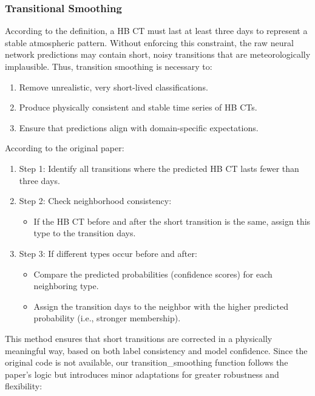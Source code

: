 \documentclass[
]{krantz}
\providecommand{\tightlist}{%
  \setlength{\itemsep}{0pt}\setlength{\parskip}{0pt}}
\begin{document}
\subsubsection{Transitional Smoothing}\label{transitional-smoothing}

According to the definition, a HB CT must last at least three days \citep{Hess1952} to represent a stable atmospheric pattern.
Without enforcing this constraint, the raw neural network predictions may contain short, noisy transitions that are meteorologically implausible.
Thus, transition smoothing is necessary to:

\begin{enumerate}
\def\labelenumi{\arabic{enumi}.}
\tightlist
\item
  Remove unrealistic, very short-lived classifications.
\item
  Produce physically consistent and stable time series of HB CTs.
\item
  Ensure that predictions align with domain-specific expectations.
\end{enumerate}

According to the original paper:

\begin{enumerate}
\def\labelenumi{\arabic{enumi}.}
\tightlist
\item
  Step 1: Identify all transitions where the predicted HB CT lasts fewer than three days.
\item
  Step 2: Check neighborhood consistency:

  \begin{itemize}
  \tightlist
  \item
    If the HB CT before and after the short transition is the same, assign this type to the transition days.
  \end{itemize}
\item
  Step 3: If different types occur before and after:

  \begin{itemize}
  \tightlist
  \item
    Compare the predicted probabilities (confidence scores) for each neighboring type.
  \item
    Assign the transition days to the neighbor with the higher predicted probability (i.e., stronger membership).
  \end{itemize}
\end{enumerate}

This method ensures that short transitions are corrected in a physically meaningful way, based on both label consistency and model confidence.
Since the original code is not available, our transition\_smoothing function follows the paper's logic but introduces minor adaptations for greater robustness and flexibility:
\end{document}
